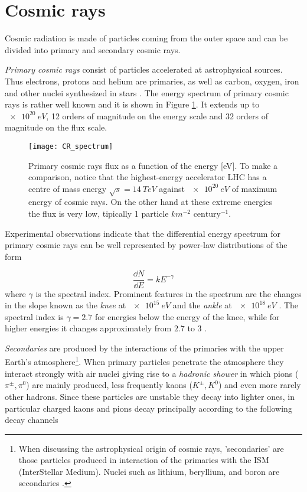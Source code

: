 \section{Cosmic rays}
\label{sec:introduction}
Cosmic radiation is made of particles coming from the outer space and can be divided into primary and secondary cosmic rays.

\emph{Primary cosmic rays} consist of particles accelerated at astrophysical sources. Thus electrons,
protons and helium are primaries, as well as carbon, oxygen, iron and other nuclei synthesized in stars \cite{PDG}.
The energy spectrum of primary cosmic rays is rather well known and it is shown in Figure \ref{CRSpectrum}. It extends up to $\SI{e20}{eV}$, 12 orders of magnitude on the energy scale and $32$ orders of magnitude on the flux scale. 
\begin{figure}[!h]
	\centering
	\texttt{[image: CR\_spectrum]} 
	
	\caption{Primary cosmic rays flux as a function of the energy [\si{eV}]. To make a comparison, notice that the highest-energy accelerator LHC has a centre of mass energy $\sqrt s = \SI{14}{TeV}$ against $\SI{e20}{eV}$ of maximum energy of cosmic rays. On the other hand at these extreme energies the flux is very low, tipically 1 particle $\si{km^{-2}}$ $\textrm{century}^{-1}$.} \label{CRSpectrum}
\end{figure}

Experimental observations indicate that the differential energy spectrum for primary cosmic rays can be well represented by power-law distributions of the form

\begin{equation}
\frac{\dd N}{\dd E} = k E^{- \gamma}
\end{equation}
where $\gamma$ is the spectral index.
Prominent features in the spectrum are the changes in the slope known as the \emph{knee} at $\SI{e15}{eV}$ and the \emph{ankle} at $\SI{e18}{eV}$ \cite{Longair}.
The spectral index is $\gamma = 2.7$ for energies below the energy of the knee, while for higher energies it changes approximately from $2.7$ to $3$ \cite{Longair}.

\emph{Secondaries} are produced by the interactions of the primaries with the upper Earth's atmosphere\footnote{When discussing the astrophysical origin of cosmic rays, 'secondaries' are those particles produced in interaction of the primaries with the ISM (InterStellar Medium). Nuclei such as lithium, beryllium, and boron are secondaries \cite{PDG}.}.
When primary particles penetrate the atmosphere they interact strongly with air nuclei giving rise to a \emph{hadronic shower} in which pions ($\pi^{\pm}, \pi^0$) are mainly produced, less frequently kaons ($K^{\pm}, K^0$) and even more rarely other hadrons.
Since these particles are unstable they decay into lighter ones, in particular charged kaons and pions decay principally according to the following decay channels 

